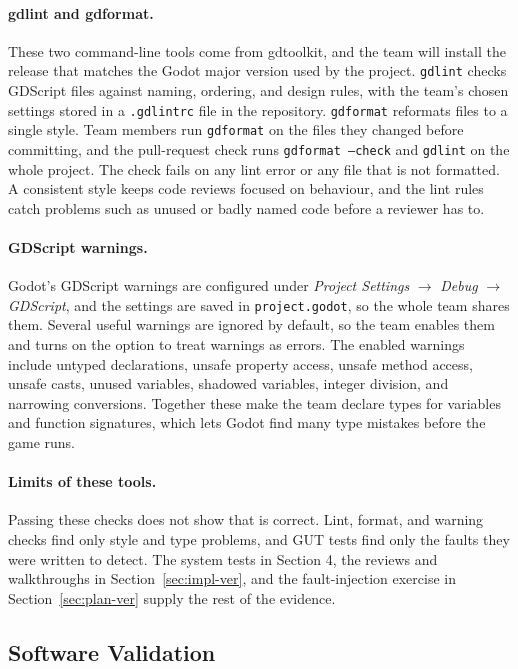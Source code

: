 \documentclass[12pt, titlepage]{article}
\begin{document}
\paragraph{gdlint and gdformat.} These two command-line tools come from
gdtoolkit, and the team will install the release that matches the Godot major
version used by the project. \texttt{gdlint} checks GDScript files against
naming, ordering, and design rules, with the team's chosen settings stored in a
\texttt{.gdlintrc} file in the repository. \texttt{gdformat} reformats files to a
single style. Team members run \texttt{gdformat} on the files they changed
before committing, and the pull-request check runs \texttt{gdformat --check}
and \texttt{gdlint} on the whole project. The check fails on any lint error or
any file that is not formatted. A consistent style keeps code reviews focused on
behaviour, and the lint rules catch problems such as unused or badly named
code before a reviewer has to.

\paragraph{GDScript warnings.} Godot's GDScript warnings are configured under
\emph{Project Settings} $\rightarrow$ \emph{Debug} $\rightarrow$
\emph{GDScript}, and the settings are saved in \texttt{project.godot}, so the
whole team shares them. Several useful warnings are ignored by default, so the
team enables them and turns on the option to treat warnings as errors. The
enabled warnings include untyped declarations, unsafe property access, unsafe
method access, unsafe casts, unused variables, shadowed variables, integer
division, and narrowing conversions. Together these make the team declare types
for variables and function signatures, which lets Godot find many type mistakes before the game runs.

\paragraph{Limits of these tools.} Passing these checks does not show that
\progname{} is correct. Lint, format, and warning checks find only style and
type problems, and GUT tests find only the faults they were written to detect.
The system tests in Section 4, the reviews and walkthroughs in
Section~\ref{sec:impl-ver}, and the fault-injection exercise in
Section~\ref{sec:plan-ver} supply the rest of the evidence.

\subsection{Software Validation}
\end{document}

